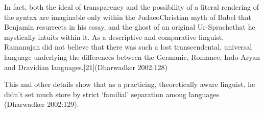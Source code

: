 \begin{myquote}
In fact, both the ideal of transparency and the possibility of a literal rendering of the syntax are imaginable only within the JudaeoChristian myth of Babel that Benjamin resurrects in his essay, and the ghost of an original Ur-Sprachethat he mystically intuits within it. As a descriptive and comparative linguist, Ramanujan did not believe that there was such a lost transcendental, universal language underlying the differences between the Germanic, Romance, Indo-Aryan and Dravidian languages.[21]\hfill (Dharwadker 2002:128)
\end{myquote}

This and other details show that as a practicing, theoretically aware linguist, he didn’t set much store by strict ‘familial’ separation among languages (Dharwadker 2002:129).

